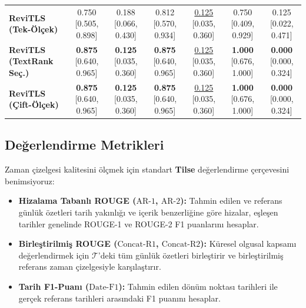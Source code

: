 ﻿\documentclass[journal]{IEEEtran}
\begin{document}
\begin{table}[t]
{\begin{tabular}{@{}l cc cc | cc@{}}
\textbf{ReviTLS (Tek-\"{O}l\c{c}ek)} & 0.750 [0.505, 0.898] & 0.188 [0.066, 0.430] & 0.812 [0.570, 0.934] & \underline{0.125} [0.035, 0.360] & 0.750 [0.409, 0.929] & 0.125 [0.022, 0.471] \\
\textbf{ReviTLS (TextRank Se\c{c}.)} & \textbf{0.875} [0.640, 0.965] & \textbf{0.125} [0.035, 0.360] & \textbf{0.875} [0.640, 0.965] & \underline{0.125} [0.035, 0.360] & \textbf{1.000} [0.676, 1.000] & \textbf{0.000} [0.000, 0.324] \\
\textbf{ReviTLS (\c{C}ift-\"{O}l\c{c}ek)} & \textbf{0.875} [0.640, 0.965] & \textbf{0.125} [0.035, 0.360] & \textbf{0.875} [0.640, 0.965] & \underline{0.125} [0.035, 0.360] & \textbf{1.000} [0.676, 1.000] & \textbf{0.000} [0.000, 0.324] \\
\bottomrule
\end{tabular}%
}
\end{table}

\subsection{De\u{g}erlendirme Metrikleri}
\label{subsec:metrics}

Zaman \c{c}izelgesi kalitesini \"{o}l\c{c}mek i\c{c}in standart \textbf{Tilse} de\u{g}erlendirme \c{c}erçevesini~\cite{martschat2017improving, martschat2018temporally} benimsiyoruz:
\begin{itemize}
    \item \textbf{Hizalama Tabanl{\i} ROUGE ($\text{AR-1}$, $\text{AR-2}$):} Tahmin edilen ve referans g\"{u}nl\"{u}k \"{o}zetleri tarih yak{\i}nl{\i}\u{g}{\i} ve i\c{c}erik benzerli\u{g}ine g\"{o}re hizalar, e\c{s}le\c{s}en tarihler genelinde ROUGE-1 ve ROUGE-2 F1 puanlar{\i}n{\i} hesaplar.
    \item \textbf{Birle\c{s}tirilmi\c{s} ROUGE ($\text{Concat-R1}$, $\text{Concat-R2}$):} K\"{u}resel olgusal kapsam{\i} de\u{g}erlendirmek i\c{c}in $\mathcal{T}$'deki t\"{u}m g\"{u}nl\"{u}k \"{o}zetleri birle\c{s}tirir ve birle\c{s}tirilmi\c{s} referans zaman \c{c}izelgesiyle kar\c{s}{\i}la\c{s}t{\i}r{\i}r.
    \item \textbf{Tarih F1-Puan{\i} ($\text{Date-F1}$):} Tahmin edilen d\"{o}n\"{u}m noktas{\i} tarihleri ile ger\c{c}ek referans tarihleri aras{\i}ndaki F1 puan{\i}n{\i} hesaplar.
\end{itemize}
\end{document}
